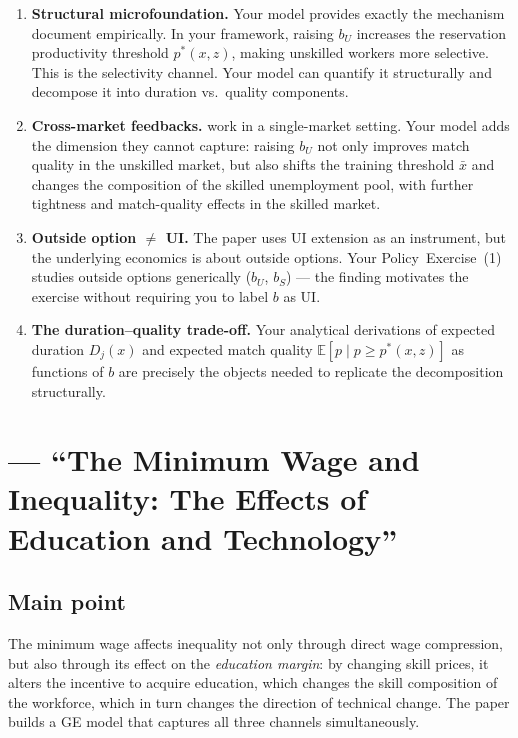 \documentclass[12pt]{article}
\begin{document}
\begin{enumerate}
    \item \textbf{Structural microfoundation.} Your model provides exactly the mechanism \citet{nekoei2017} document empirically. In your framework, raising $b_U$ increases the reservation productivity threshold $p^*(x,z)$, making unskilled workers more selective. This is the selectivity channel. Your model can quantify it structurally and decompose it into duration vs.\ quality components.

    \item \textbf{Cross-market feedbacks.} \citet{nekoei2017} work in a single-market setting. Your model adds the dimension they cannot capture: raising $b_U$ not only improves match quality in the unskilled market, but also shifts the training threshold $\bar{x}$ and changes the composition of the skilled unemployment pool, with further tightness and match-quality effects in the skilled market.

    \item \textbf{Outside option $\neq$ UI.} The paper uses UI extension as an instrument, but the underlying economics is about outside options. Your Policy~Exercise~(1) studies outside options generically ($b_U$, $b_S$) --- the \citet{nekoei2017} finding motivates the exercise without requiring you to label $b$ as UI.

    \item \textbf{The duration--quality trade-off.} Your analytical derivations of expected duration $D_j(x)$ and expected match quality $\mathbb{E}[p \mid p \geq p^*(x,z)]$ as functions of $b$ are precisely the objects needed to replicate the \citet{nekoei2017} decomposition structurally.
\end{enumerate}


\section{\citet{barany2016} --- ``The Minimum Wage and Inequality: The Effects of Education and Technology''}

\subsection*{Main point}

The minimum wage affects inequality not only through direct wage compression, but also through its effect on the \emph{education margin}: by changing skill prices, it alters the incentive to acquire education, which changes the skill composition of the workforce, which in turn changes the direction of technical change. The paper builds a GE model that captures all three channels simultaneously.
\end{document}
